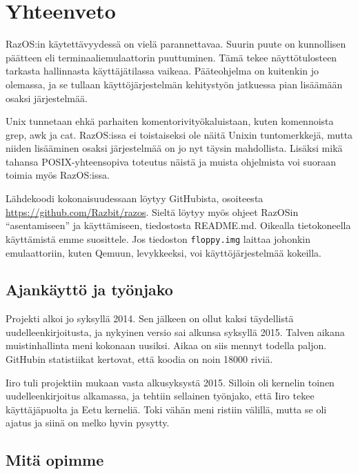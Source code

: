 \chapter{Yhteenveto}

RazOS:in käytettävyydessä on vielä parannettavaa. Suurin puute on kunnollisen päätteen eli terminaaliemulaattorin puuttuminen. Tämä tekee näyttötulosteen tarkasta hallinnasta käyttäjätilassa vaikeaa. Pääteohjelma on kuitenkin jo olemassa, ja se tullaan käyttöjärjestelmän kehitystyön jatkuessa pian lisäämään osaksi järjestelmää.

\par

Unix tunnetaan ehkä parhaiten komentorivityökaluistaan, kuten komennoista grep, awk ja cat. RazOS:issa ei toistaiseksi ole näitä Unixin tuntomerkkejä, mutta niiden lisääminen osaksi järjestelmää on jo nyt täysin mahdollista. Lisäksi mikä tahansa POSIX-yhteensopiva toteutus näistä ja muista ohjelmista voi suoraan toimia myös RazOS:issa.

\par

Lähdekoodi kokonaisuudessaan löytyy GitHubista, osoiteesta \url{https://github.com/Razbit/razos}. Sieltä löytyy myös ohjeet RazOSin ``asentamiseen'' ja käyttämiseen, tiedostosta README.md. Oikealla tietokoneella käyttämistä emme suosittele. Jos tiedoston \texttt{floppy.img} laittaa johonkin emulaattoriin, kuten Qemuun, levykkeeksi, voi käyttöjärjestelmää kokeilla.

\section{Ajankäyttö ja työnjako}

Projekti alkoi jo syksyllä 2014. Sen jälkeen on ollut kaksi täydellistä uudelleenkirjoitusta, ja nykyinen versio sai alkunsa syksyllä 2015. Talven aikana muistinhallinta meni kokonaan uusiksi. Aikaa on siis mennyt todella paljon. GitHubin statistiikat kertovat, että koodia on noin 18000 riviä.

\par

Iiro tuli projektiin mukaan vasta alkusyksystä 2015. Silloin oli kernelin toinen uudelleenkirjoitus alkamassa, ja tehtiin sellainen työnjako, että Iiro tekee käyttäjäpuolta ja Eetu kerneliä. Toki vähän meni ristiin välillä, mutta se oli ajatus ja siinä on melko hyvin pysytty.

\section{Mitä opimme}

